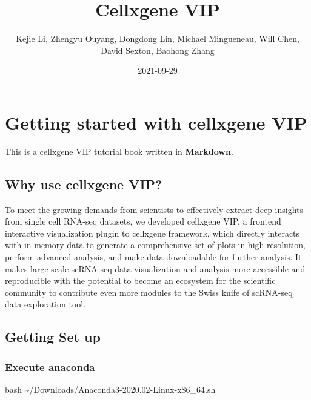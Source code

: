 \documentclass[
]{article}
\title{Cellxgene VIP}
\author{Kejie Li, Zhengyu Ouyang, Dongdong Lin, Michael Mingueneau, Will Chen, David Sexton, Baohong Zhang}
\date{2021-09-29}
\newenvironment{Shaded}{\begin{snugshade}}{\end{snugshade}}
\newcommand{\FunctionTok}[1]{\textcolor[rgb]{0.00,0.00,0.00}{#1}}
\newcommand{\NormalTok}[1]{#1}
\begin{document}
\maketitle

{
\setcounter{tocdepth}{2}
\tableofcontents
}
\hypertarget{getting-started-with-cellxgene-vip}{%
\section{Getting started with cellxgene VIP}\label{getting-started-with-cellxgene-vip}}

This is a cellxgene VIP tutorial book written in \textbf{Markdown}.

\hypertarget{why-use-cellxgene-vip}{%
\subsection{Why use cellxgene VIP?}\label{why-use-cellxgene-vip}}

To meet the growing demands from scientists to effectively extract deep insights from single cell RNA-seq datasets, we developed cellxgene VIP, a frontend interactive visualization plugin to cellxgene framework, which directly interacts with in-memory data to generate a comprehensive set of plots in high resolution, perform advanced analysis, and make data downloadable for further analysis. It makes large scale scRNA-seq data visualization and analysis more accessible and reproducible with the potential to become an ecosystem for the scientific community to contribute even more modules to the Swiss knife of scRNA-seq data exploration tool.

\hypertarget{getting-set-up}{%
\subsection{Getting Set up}\label{getting-set-up}}

\hypertarget{execute-anaconda}{%
\subsubsection{Execute anaconda}\label{execute-anaconda}}

\begin{Shaded}
\begin{Highlighting}[]
\FunctionTok{bash}\NormalTok{ \textasciitilde{}/Downloads/Anaconda3{-}2020.02{-}Linux{-}x86\_64.sh}
\end{Highlighting}
\end{Shaded}
\end{document}
